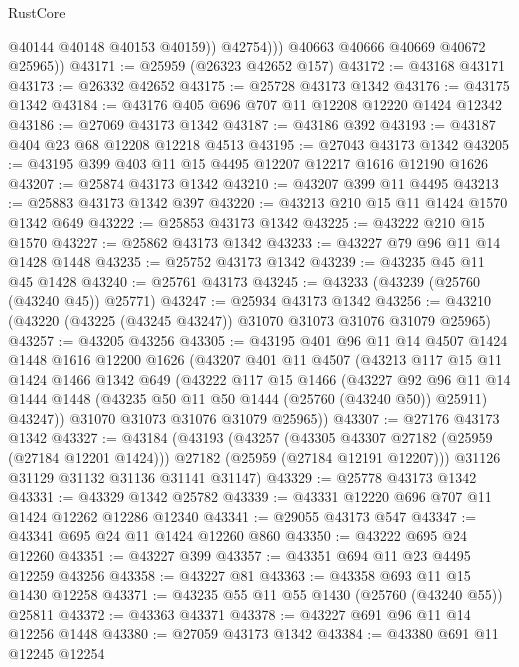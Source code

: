 \begin{lexlean}{RustCore}
\begin{coremodule}
                  @40144
                  @40148
                  @40153
                  @40159))
              @42754)))
        @40663
        @40666
        @40669
        @40672
        @25965))
@43171 := @25959 (@26323 @42652 @157)
@43172 := @43168 @43171
@43173 := @26332 @42652
@43175 := @25728 @43173 @1342
@43176 := @43175 @1342
@43184 := @43176 @405 @696 @707 @11 @12208 @12220 @1424 @12342
@43186 := @27069 @43173 @1342
@43187 := @43186 @392
@43193 := @43187 @404 @23 @68 @12208 @12218 @4513
@43195 := @27043 @43173 @1342
@43205 := @43195 @399 @403 @11 @15 @4495 @12207 @12217 @1616 @12190 @1626
@43207 := @25874 @43173 @1342
@43210 := @43207 @399 @11 @4495
@43213 := @25883 @43173 @1342 @397
@43220 := @43213 @210 @15 @11 @1424 @1570 @1342 @649
@43222 := @25853 @43173 @1342
@43225 := @43222 @210 @15 @1570
@43227 := @25862 @43173 @1342
@43233 := @43227 @79 @96 @11 @14 @1428 @1448
@43235 := @25752 @43173 @1342
@43239 := @43235 @45 @11 @45 @1428
@43240 := @25761 @43173
@43245 := @43233 (@43239 (@25760 (@43240 @45)) @25771)
@43247 := @25934 @43173 @1342
@43256 := @43210 (@43220 (@43225 (@43245 @43247)) @31070 @31073 @31076 @31079 @25965)
@43257 := @43205 @43256
@43305 := @43195
    @401
    @96
    @11
    @14
    @4507
    @1424
    @1448
    @1616
    @12200
    @1626
    (@43207
      @401
      @11
      @4507
      (@43213
        @117
        @15
        @11
        @1424
        @1466
        @1342
        @649
        (@43222
          @117
          @15
          @1466
          (@43227
            @92
            @96
            @11
            @14
            @1444
            @1448
            (@43235 @50 @11 @50 @1444 (@25760 (@43240 @50)) @25911)
            @43247))
        @31070
        @31073
        @31076
        @31079
        @25965))
@43307 := @27176 @43173 @1342
@43327 := @43184
    (@43193
      (@43257
        (@43305 @43307 @27182 (@25959 (@27184 @12201 @1424)))
        @27182
        (@25959 (@27184 @12191 @12207)))
      @31126
      @31129
      @31132
      @31136
      @31141
      @31147)
@43329 := @25778 @43173 @1342
@43331 := @43329 @1342 @25782
@43339 := @43331 @12220 @696 @707 @11 @1424 @12262 @12286 @12340
@43341 := @29055 @43173 @547
@43347 := @43341 @695 @24 @11 @1424 @12260 @860
@43350 := @43222 @695 @24 @12260
@43351 := @43227 @399
@43357 := @43351 @694 @11 @23 @4495 @12259 @43256
@43358 := @43227 @81
@43363 := @43358 @693 @11 @15 @1430 @12258
@43371 := @43235 @55 @11 @55 @1430 (@25760 (@43240 @55)) @25811
@43372 := @43363 @43371
@43378 := @43227 @691 @96 @11 @14 @12256 @1448
@43380 := @27059 @43173 @1342
@43384 := @43380 @691 @11 @12245 @12254

\end{coremodule}
\end{lexlean}
